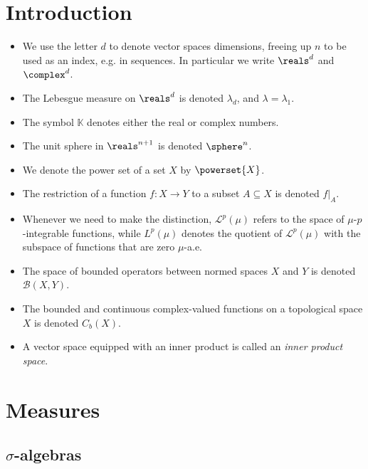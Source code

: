 \documentclass[article, a4paper, 11pt, oneside]{memoir}
\title{\doctitle}
\author{\docauthor}
\numberwithin{equation}{chapter}
\newcommand{\calB}{\mathcal{B}}
\newcommand{\calL}{\mathcal{L}}
\newcommand{\bbK}{\mathbb{K}}
\theoremstyle{nonumberplain}
\begin{document}
\maketitle

\setcounter{chapter}{-1}
\chapter{Introduction}

\begin{itemize}
	\item We use the letter $d$ to denote vector spaces dimensions, freeing up $n$ to be used as an index, e.g. in sequences. In particular we write $\reals^d$ and $\complex^d$.
	\item The Lebesgue measure on $\reals^d$ is denoted $\lambda_d$, and $\lambda = \lambda_1$.
	\item The symbol $\bbK$ denotes either the real or complex numbers.
	\item The unit sphere in $\reals^{n+1}$ is denoted $\sphere^n$.
	\item We denote the power set of a set $X$ by $\powerset{X}$.
	\item The restriction of a function $f \colon X \to Y$ to a subset $A \subseteq X$ is denoted $f|_A$.
	\item Whenever we need to make the distinction, $\calL^p(\mu)$ refers to the space of $\mu$-$p$-integrable functions, while $L^p(\mu)$ denotes the quotient of $\calL^p(\mu)$ with the subspace of functions that are zero $\mu$-a.e.
	\item The space of bounded operators between normed spaces $X$ and $Y$ is denoted $\calB(X,Y)$.
	\item The bounded and continuous complex-valued functions on a topological space $X$ is denoted $C_b(X)$.
	\item A vector space equipped with an inner product is called an \emph{inner product space}.
\end{itemize}




\chapter{Measures}

\addtocounter{section}{1}
\section[Sigma-algebras][$\sigma$-algebras]{$\sigma$-algebras}
\end{document}
